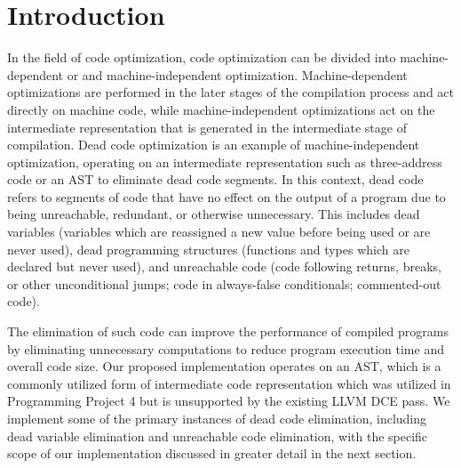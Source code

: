 \documentclass[sigconf]{acmart}
\begin{document}



\maketitle

\section{Introduction}
In the field of code optimization, code optimization can be divided into machine-dependent or and machine-independent optimization. Machine-dependent optimizations are performed in the later stages of the compilation process and act directly on machine code, while machine-independent optimizations act on the intermediate representation that is generated in the intermediate stage of compilation. Dead code optimization is an example of machine-independent optimization, operating on an intermediate representation such as three-address code or an AST to eliminate dead code segments. In this context, dead code refers to segments of code that have no effect on the output of a program due to being unreachable, redundant, or otherwise unnecessary. This includes dead variables (variables which are reassigned a new value before being used or are never used), dead programming structures (functions and types which are declared but never used), and unreachable code (code following returns, breaks, or other unconditional jumps; code in always-false conditionals; commented-out code).

The elimination of such code can improve the performance of compiled programs by eliminating unnecessary computations to reduce program execution time and overall code size. Our proposed implementation operates on an AST, which is a commonly utilized form of intermediate code representation which was utilized in Programming Project 4 but is unsupported by the existing LLVM DCE pass. We implement some of the primary instances of dead code elimination, including dead variable elimination and unreachable code elimination, with the specific scope of our implementation discussed in greater detail in the next section.
\end{document}
